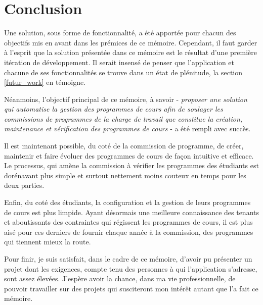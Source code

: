 \chapter{Conclusion}
\label{conclusion}
Une solution, sous forme de fonctionnalité, a été apportée pour chacun des objectifs mis en avant dans les prémices de ce mémoire. Cependant, il faut garder à l'esprit que la solution présentée dans ce mémoire est le résultat d'une première itération de développement. Il serait insensé de penser que l'application et chacune de ses fonctionnalités se trouve dans un état de plénitude, la section \ref{futur_work} en témoigne. 

Néanmoins, l'objectif principal de ce mémoire, à savoir - \textit{proposer une solution qui automatise la gestion des programmes de cours afin de soulager les commissions de programmes de la charge de travail que constitue la création, maintenance et vérification des programmes de cours} - a été rempli avec succès.

Il est maintenant possible, du coté de la commission de programme, de créer, maintenir et faire évoluer des programmes de cours de façon intuitive et efficace. Le processus, qui amène la commission à vérifier les programmes des étudiants est dorénavant plus simple et surtout nettement moins couteux en temps pour les deux parties.

Enfin, du coté des étudiants, la configuration et la gestion de leurs programmes de cours est plus limpide. Ayant désormais une meilleure connaissance des tenants et aboutissants des contraintes qui régissent les programmes de cours, il est plus aisé pour ces derniers de fournir chaque année à la commission,  des programmes qui tiennent mieux la route. 

Pour finir, je suis satisfait, dans le cadre de ce mémoire, d'avoir pu présenter un projet dont les exigences, compte tenu des personnes à qui l'application s'adresse, sont assez élevées. J'espère avoir la chance, dans ma vie professionnelle, de pouvoir travailler sur des projets qui susciteront mon intérêt autant que l'a fait ce mémoire.

